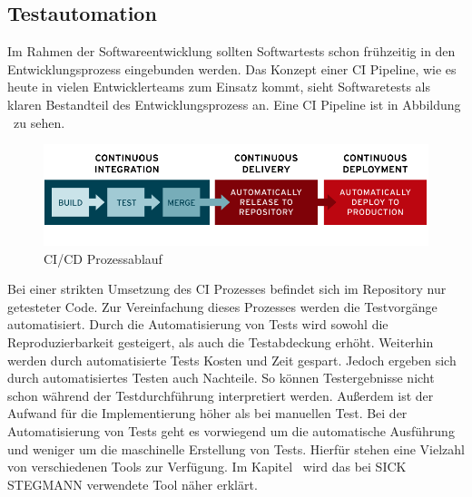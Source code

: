 	\subsection{Testautomation}
	Im Rahmen der Softwareentwicklung sollten Softwartests schon frühzeitig in den Entwicklungsprozess eingebunden werden. Das Konzept einer CI Pipeline, wie es heute in vielen Entwicklerteams zum Einsatz kommt, sieht Softwaretests als klaren Bestandteil des Entwicklungsprozess an. Eine CI Pipeline ist in Abbildung \dq {}\dq~zu sehen.
\begin{figure}[h]
	\centering
  \includegraphics[width=1\textwidth]{img/CI.png} 
   \caption[CI/CD Prozessablauf]{CI/CD Prozessablauf \cite{RedHat.2021}}
  \label{fig:CICD.jpg}
\end{figure}

Bei einer strikten Umsetzung des CI Prozesses befindet sich im Repository nur getesteter Code\cite{RedHat.2021}. Zur Vereinfachung dieses Prozesses werden die Testvorgänge automatisiert. Durch die Automatisierung von Tests wird sowohl die Reproduzierbarkeit gesteigert, als auch die Testabdeckung erhöht. Weiterhin werden durch automatisierte Tests Kosten und Zeit gespart\cite{Witte.2016}. Jedoch ergeben sich durch automatisiertes Testen auch Nachteile. So können Testergebnisse nicht schon während der Testdurchführung interpretiert werden. Außerdem ist der Aufwand für die Implementierung höher als bei manuellen Test\cite{Witte.2016}. Bei der Automatisierung von Tests geht es vorwiegend um die automatische Ausführung und weniger um die maschinelle Erstellung von Tests. Hierfür stehen eine Vielzahl von verschiedenen Tools zur Verfügung. Im Kapitel \dq{}\dq~wird das bei SICK STEGMANN verwendete Tool näher erklärt.
\newpage

